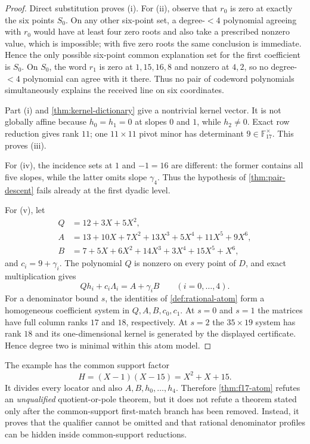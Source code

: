 \documentclass[11pt,a4paper]{amsart}
\numberwithin{equation}{section}
\theoremstyle{remark}
\newcommand{\F}{\mathbb F}\newcommand{\B}{\mathbb B}\newcommand{\K}{\mathbb K}\newcommand{\Z}{\mathbb Z}
\begin{document}
\begin{proof}
Direct substitution proves (i).  For (ii), observe that $r_0$ is zero at exactly the six points $S_0$.  On any other six-point set, a degree-$<4$ polynomial agreeing with $r_0$ would have at least four zero roots and also take a prescribed nonzero value, which is impossible; with five zero roots the same conclusion is immediate.  Hence the only possible six-point common explanation set for the first coefficient is $S_0$.  On $S_0$, the word $r_1$ is zero at $1,15,16,8$ and nonzero at $4,2$, so no degree-$<4$ polynomial can agree with it there.  Thus no pair of codeword polynomials simultaneously explains the received line on six coordinates.

Part (i) and \cref{thm:kernel-dictionary} give a nontrivial kernel vector.  It is not globally affine because $h_0=h_1=0$ at slopes $0$ and $1$, while $h_2\ne0$.  Exact row reduction gives rank $11$; one $11\times11$ pivot minor has determinant $9\in\F_{17}^\times$.  This proves (iii).

For (iv), the incidence sets at $1$ and $-1=16$ are different: the former contains all five slopes, while the latter omits slope $\gamma_4$.  Thus the hypothesis of \cref{thm:pair-descent} fails already at the first dyadic level.

For (v), let
\[
\begin{aligned}
 Q&=12+3X+5X^2,\\
 A&=13+10X+7X^2+13X^3+5X^4+11X^5+9X^6,\\
 B&=7+5X+6X^2+14X^3+3X^4+15X^5+X^6,
\end{aligned}
\]
and $c_i=9+\gamma_i$.  The polynomial $Q$ is nonzero on every point of $D$, and exact multiplication gives
\[
 Qh_i+c_i\Lambda_i=A+\gamma_iB
 \qquad(i=0,\ldots,4).
\]
For a denominator bound $s$, the identities of \cref{def:rational-atom} form a homogeneous coefficient system in $Q,A,B,c_0,c_1$.  At $s=0$ and $s=1$ the matrices have full column ranks $17$ and $18$, respectively.  At $s=2$ the $35\times19$ system has rank $18$ and its one-dimensional kernel is generated by the displayed certificate.  Hence degree two is minimal within this atom model.
\end{proof}

\begin{remark}\label{rem:common-factor}
The example has the common support factor
\[
 H=(X-1)(X-15)=X^2+X+15.
\]
It divides every locator and also $A,B,h_0,\ldots,h_4$.  Therefore \cref{thm:f17-atom} refutes an \emph{unqualified} quotient-or-pole theorem, but it does not refute a theorem stated only after the common-support first-match branch has been removed.  Instead, it proves that the qualifier cannot be omitted and that rational denominator profiles can be hidden inside common-support reductions.
\end{remark}
\end{document}
